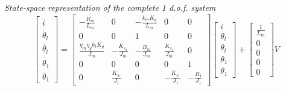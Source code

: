 \textit{State-space representation of the complete 1 d.o.f. system}
\begin{equation}
	\begin{bmatrix}
			\dot{i} \\
			\dot{\theta_l} \\
			\ddot{\theta_l} \\
			\dot{\theta_1} \\
			\ddot{\theta_1}
	\end{bmatrix}
	=
	\begin{bmatrix}
		-\frac{R_m}{L_m} & 0 & -\frac{k_m K_g}{L_m} & 0 & 0 \\
		0 & 0 &1 & 0 & 0 \\
		\frac{\eta_m \eta_g k_t K_g}{J_m} & -\frac{K_{s_1}}{J_m} & -\frac{B_m}{J_m} & \frac{K_{s_1}}{J_m} & 0 \\
		0 & 0 & 0 & 0 & 1 \\
		0 & \frac{K_{s_1}}{J_1} & 0 & -\frac{K_{s_1}}{J_1} & -\frac{B_1}{J_1}
	\end{bmatrix}
	\begin{bmatrix}
		i \\
		\theta_l \\
		\theta_l \\
		\theta_1 \\
		\theta_1
	\end{bmatrix}
	+
	\begin{bmatrix}
		\frac{1}{L_m} \\
		0 \\
		0 \\
		0 \\
		0
	\end{bmatrix}
	V
\end{equation}

